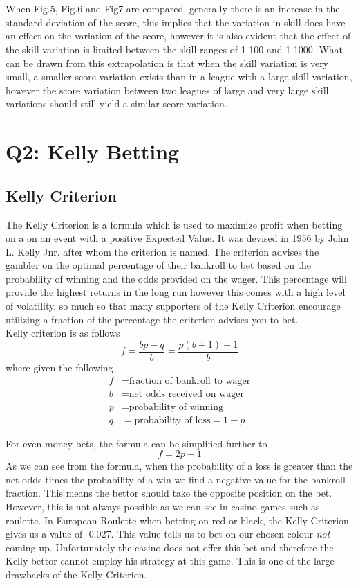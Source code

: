 \documentclass[12pt]{article}
\begin{document}
\\\\
When Fig.5, Fig.6 and Fig7 are compared, generally there is an increase in the standard deviation of the score, this implies that the variation in skill does have an effect on the variation of the score, however it is also evident that the effect of the skill variation is limited between the skill ranges of 1-100 and 1-1000. What can be drawn from this extrapolation is that when the skill variation is very small, a smaller score variation exists than in a league with a large skill variation, however the score variation between two leagues of large and very large skill variations should still yield a similar score variation.
\clearpage
\section{Q2: Kelly Betting}
\subsection{Kelly Criterion}
The Kelly Criterion is a formula which is used to maximize profit when betting on a on an event with a positive Expected Value. It was devised in 1956 by John L. Kelly Jnr. after whom the criterion is named. The criterion advises the gambler on the optimal percentage of their bankroll to bet based on the probability of winning and the odds provided on the wager. This percentage will provide the highest returns in the long run however this comes with a high level of volatility, so much so that many supporters of the Kelly Criterion encourage utilizing a fraction of the percentage the criterion advises you to bet.
\\
Kelly criterion is as follows
$$f=\frac{bp-q}{b}=\frac{p(b+1)-1}{b}$$
where given the following
\begin{align*}
f&=\text{fraction of bankroll to wager}\\
b&=\text{net odds received on wager}\\
p&=\text{probability of winning}\\
q&=\text{probability of loss}=1-p
\end{align*}

For even-money bets, the formula can be simplified further to
$$f=2p-1$$
As we can see from the formula, when the probability of a loss is greater than the net odds times the probability of a win we find a negative value for the bankroll fraction. This means the bettor should take the opposite position on the bet. However, this is not always possible as we can see in casino games such as roulette. In European Roulette when betting on red or black, the Kelly Criterion gives us a value of -0.027. This value tells us to bet on our chosen colour \emph{not} coming up. Unfortunately the casino does not offer this bet and therefore the Kelly bettor cannot employ his strategy at this game. This is one of the large drawbacks of the Kelly Criterion.
\end{document}
